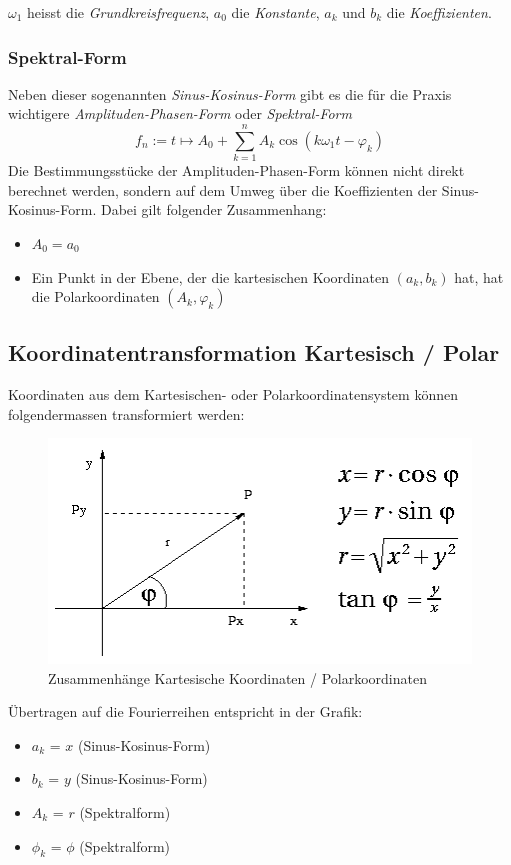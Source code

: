 \documentclass[10pt,a4paper]{scrartcl}
\begin{document}
$\omega_1$ heisst die \emph{Grundkreisfrequenz}, $a_0$ die
\emph{Konstante}, $a_k$ und $b_k$ die \emph{Koeffizienten}.

\subsubsection{Spektral-Form}
Neben dieser sogenannten \emph{Sinus-Kosinus-Form} gibt es die für die
Praxis wichtigere \emph{Amplituden-Phasen-Form} oder \emph{Spektral-Form}
$$f_n := t \mapsto A_0 + \sum_{k=1}^n A_k \cos(k\omega_1t - \varphi_k)$$
Die Bestimmungsstücke der Amplituden-Phasen-Form können nicht direkt berechnet
werden, sondern auf dem Umweg über die Koeffizienten der Sinus-Kosinus-Form.
Dabei gilt folgender Zusammenhang:
\begin{itemize}
    \item $A_0 = a_0$
    \item Ein Punkt in der Ebene, der die kartesischen Koordinaten $(a_k, b_k)$
    hat, hat die Polarkoordinaten $(A_k, \varphi_k)$
\end{itemize}


\subsection{Koordinatentransformation Kartesisch / Polar}

Koordinaten aus dem Kartesischen- oder Polarkoordinatensystem können
folgendermassen transformiert werden:

\begin{figure}[H]
    \centering
    \includegraphics[scale=0.5]{img/Koordinatentransformation.png}
    \caption{Zusammenhänge Kartesische Koordinaten / Polarkoordinaten}
\end{figure}

Übertragen auf die Fourierreihen entspricht in der Grafik:
\begin{itemize}
    \item $a_k$ = $x$ (Sinus-Kosinus-Form)
    \item $b_k$ = $y$ (Sinus-Kosinus-Form)
    \item $A_k$ = $r$ (Spektralform)
    \item $\phi_k$ = $\phi$ (Spektralform)
\end{itemize}
\end{document}
